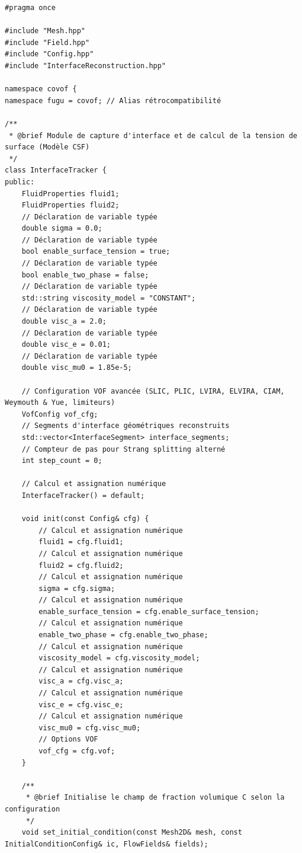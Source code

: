\documentclass[10pt,a4paper,oneside]{book}
\begin{document}
\begin{lstlisting}[language={[11]C++}]
#pragma once

#include "Mesh.hpp"
#include "Field.hpp"
#include "Config.hpp"
#include "InterfaceReconstruction.hpp"

namespace covof {
namespace fugu = covof; // Alias rétrocompatibilité

/**
 * @brief Module de capture d'interface et de calcul de la tension de surface (Modèle CSF)
 */
class InterfaceTracker {
public:
    FluidProperties fluid1;
    FluidProperties fluid2;
    // Déclaration de variable typée
    double sigma = 0.0;
    // Déclaration de variable typée
    bool enable_surface_tension = true;
    // Déclaration de variable typée
    bool enable_two_phase = false;
    // Déclaration de variable typée
    std::string viscosity_model = "CONSTANT";
    // Déclaration de variable typée
    double visc_a = 2.0;
    // Déclaration de variable typée
    double visc_e = 0.01;
    // Déclaration de variable typée
    double visc_mu0 = 1.85e-5;

    // Configuration VOF avancée (SLIC, PLIC, LVIRA, ELVIRA, CIAM, Weymouth & Yue, limiteurs)
    VofConfig vof_cfg;
    // Segments d'interface géométriques reconstruits
    std::vector<InterfaceSegment> interface_segments;
    // Compteur de pas pour Strang splitting alterné
    int step_count = 0;

    // Calcul et assignation numérique
    InterfaceTracker() = default;

    void init(const Config& cfg) {
        // Calcul et assignation numérique
        fluid1 = cfg.fluid1;
        // Calcul et assignation numérique
        fluid2 = cfg.fluid2;
        // Calcul et assignation numérique
        sigma = cfg.sigma;
        // Calcul et assignation numérique
        enable_surface_tension = cfg.enable_surface_tension;
        // Calcul et assignation numérique
        enable_two_phase = cfg.enable_two_phase;
        // Calcul et assignation numérique
        viscosity_model = cfg.viscosity_model;
        // Calcul et assignation numérique
        visc_a = cfg.visc_a;
        // Calcul et assignation numérique
        visc_e = cfg.visc_e;
        // Calcul et assignation numérique
        visc_mu0 = cfg.visc_mu0;
        // Options VOF
        vof_cfg = cfg.vof;
    }

    /**
     * @brief Initialise le champ de fraction volumique C selon la configuration
     */
    void set_initial_condition(const Mesh2D& mesh, const InitialConditionConfig& ic, FlowFields& fields);


\end{lstlisting}
\end{document}
